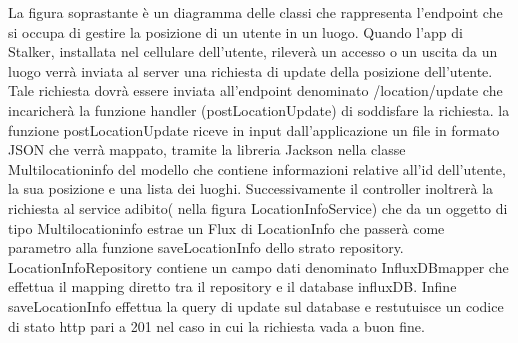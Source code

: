 \documentclass[../manuale-manutentore.tex]{subfiles}
\begin{document}
  La figura soprastante è un diagramma delle classi che rappresenta l'endpoint che si occupa di gestire la posizione di un utente in un luogo.
  Quando l'app di Stalker, installata nel cellulare dell'utente, rileverà un accesso o un uscita da un luogo verrà inviata al server una richiesta di update della posizione dell'utente.
  Tale richiesta dovrà essere inviata all'endpoint denominato /location/update che incaricherà la funzione handler (postLocationUpdate) di soddisfare la richiesta.
  la funzione postLocationUpdate riceve in input dall'applicazione un file in formato JSON che verrà mappato, tramite la libreria Jackson nella classe Multilocationinfo del modello che contiene informazioni relative all'id dell'utente, la sua posizione e una lista dei luoghi.
  Successivamente il controller inoltrerà la richiesta al service adibito( nella figura LocationInfoService) che da un oggetto di tipo Multilocationinfo estrae un Flux di LocationInfo che passerà come parametro alla funzione saveLocationInfo dello strato repository.
  LocationInfoRepository contiene un campo dati denominato InfluxDBmapper che effettua il mapping diretto tra il repository e il database influxDB. Infine saveLocationInfo effettua la query di update sul database e restutuisce un codice di stato http pari a 201 nel caso in cui la richiesta vada a buon fine.
\end{document}
